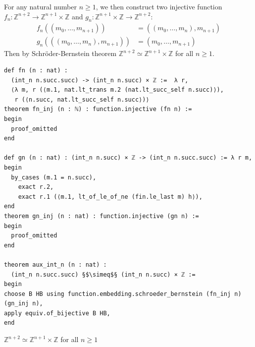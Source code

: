 \documentclass{report}
\theoremstyle{definition}
\newenvironment{code}{\captionsetup{type=listing}}{}
\begin{document}
For any natural number $n\ge 1$, we then construct two injective function $f_n : \mathbb{Z}^{n+2}\to\mathbb{Z}^{n+1}\times\mathbb{Z}$ and $g_n:\mathbb{Z}^{n+1}\times\mathbb{Z}\to\mathbb{Z}^{n+2}$:
\begin{equation*}
\begin{aligned}
f_n((m_0,\dots,m_{n+1}))&=((m_0,\dots,m_{n}),m_{n+1})\\
g_n(((m_0,\dots,m_{n}), m_{n+1}))&=(m_0,\dots,m_{n+1})
\end{aligned}
\end{equation*}
Then by Schröder-Bernstein theorem $\mathbb{Z}^{n+2}\simeq\mathbb{Z}^{n+1}\times\mathbb{Z}$ for all $n\ge 1$.
\begin{code}
\begin{verbatim}
def fn (n : nat) : 
  (int_n n.succ.succ) -> (int_n n.succ) × ℤ :=  λ r,
  ⟨λ m, r (⟨m.1, nat.lt_trans m.2 (nat.lt_succ_self n.succ)⟩), 
   r (⟨n.succ, nat.lt_succ_self n.succ⟩)⟩
theorem fn_inj (n : ℕ) : function.injective (fn n) :=
begin
  proof_omitted
end

def gn (n : nat) : (int_n n.succ) × ℤ -> (int_n n.succ.succ) := λ r m,
begin
  by_cases (m.1 = n.succ),
    exact r.2,
    exact r.1 (⟨m.1, lt_of_le_of_ne (fin.le_last m) h⟩),
end
theorem gn_inj (n : nat) : function.injective (gn n) :=
begin
  proof_omitted
end
  
theorem aux_int_n (n : nat) :
  (int_n n.succ.succ) §$\simeq$§ (int_n n.succ) × ℤ :=
begin
choose B HB using function.embedding.schroeder_bernstein (fn_inj n) (gn_inj n),
apply equiv.of_bijective B HB,
end
\end{verbatim}
\caption{$\mathbb{Z}^{n+2}\simeq\mathbb{Z}^{n+1}\times\mathbb{Z}$ for all $n\ge 1$}
\end{code}
\end{document}
